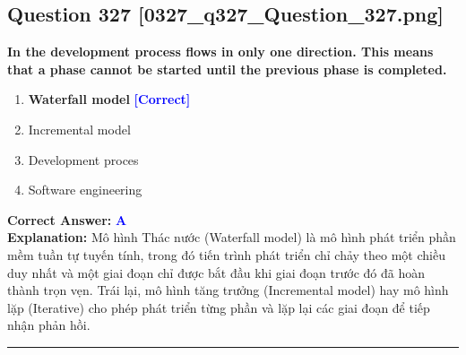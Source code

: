 \documentclass[11pt,a4paper]{article}
\begin{document}
\begin{minipage}{\textwidth}
\subsection*{Question 327 \quad \footnotesize{[0327\_q327\_Question\_327.png]}}
\noindent \textbf{In the development process flows in only one direction. This means that a phase cannot be started until the previous phase is completed.}

\begin{enumerate}[label=\Alph*.]
    \item \textbf{Waterfall model} \hfill \textcolor{blue}{\textbf{[Correct]}}
    \item Incremental model
    \item Development proces
    \item Software engineering
\end{enumerate}

\noindent \textbf{Correct Answer:} \textcolor{blue}{\textbf{A}} \\[2pt]
\noindent \textbf{Explanation:} Mô hình Thác nước (Waterfall model) là mô hình phát triển phần mềm tuần tự tuyến tính, trong đó tiến trình phát triển chỉ chảy theo một chiều duy nhất và một giai đoạn chỉ được bắt đầu khi giai đoạn trước đó đã hoàn thành trọn vẹn. Trái lại, mô hình tăng trưởng (Incremental model) hay mô hình lặp (Iterative) cho phép phát triển từng phần và lặp lại các giai đoạn để tiếp nhận phản hồi.

\par\vspace{0.3cm}
\hrule
\vspace{0.3cm}
\end{minipage}
\end{document}

